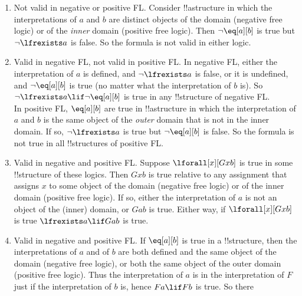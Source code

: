\documentclass[../../../../include/open-logic-section]{subfiles}
\begin{document}
\begin{prob}
\begin{ans}
\begin{enumerate}
	FL. In negative FL, $Fa$ is false if the  interpretation of $a$ is
	undefined, and $\lfrexists a$ is true if the interpretation of $a$ is
	defined. So $Fa\lif \lfrexists a$ is true in any !!{structure} of
	negative FL.\\ 
	In positive free logic, $Fa$ is true and $\lfrexists a$
	false when the interpretation of  $a$ is an object of the \emph{outer}
	domain that is not in the inner domain (but within the interpretation of
	$F$). Hence $Fa\lif \lfrexists a$ is not true in all !!{structure}s of
	positive FL. 
\item Not valid in negative or positive FL. Consider
	!!a{structure} in which the  interpretations of $a$ and $b$ are distinct
	objects of the domain (negative free logic) or of the \emph{inner}
	domain (positive free logic). Then $\lnot\eq[a][b]$ is true but $\lnot
	\lfrexists a$ is false. So the formula is not valid in either logic. 
\item Valid in negative FL, not valid in positive FL. In negative FL,
	either the interpretation of $a$ is defined, and $\lnot \lfrexists a$
	is false, or it is undefined, and $\lnot \eq[a][b]$ is true (no matter
	what the interpretation of $b$ is). So $\lnot \lfrexists a\lif\lnot
	\eq[a][b]$ is true in any !!{structure} of negative FL.\\ 
	In positive FL, $\eq[a][b]$ are true in !!a{structure} in which the
	interpretation of $a$ and $b$ is the same object of the \emph{outer}
	domain that is not in the inner domain. If so, $\lnot \lfrexists a $ is
	true but $\lnot \eq[a][b]$ is false. So the formula is not true in all
	!!{structure}s of positive FL.
\item Valid in negative and positive FL. Suppose $\lforall[x][Gxb]$ is 
	true in some !!{structure} of these logics. Then $Gxb$ is true relative
	to any assignment that assigns $x$ to some object of the domain (negative
	free logic) or of the inner domain (positive free logic). If so, 
	either the interpretation of $a$ is not an object of the (inner) domain,
	or $Gab$ is true. Either way, if  $\lforall[x][Gxb]$ is 
	true $\lfrexists a \lif Gab$ is true.
\item Valid in negative and positive FL. If $\eq[a][b]$ is true in a 
	!!{structure}, then the interpretations of $a$ and of $b$ are both
	defined and the same object of the domain (negative free logic), or
	both the same object of the outer domain (positive free logic). Thus
	the interpretation of $a$ is in the interpretation of $F$ just if 
	the interpretation of $b$ is, hence $Fa \lif Fb$ is true. So there

\end{enumerate}
\end{ans}
\end{prob}
\end{document}
